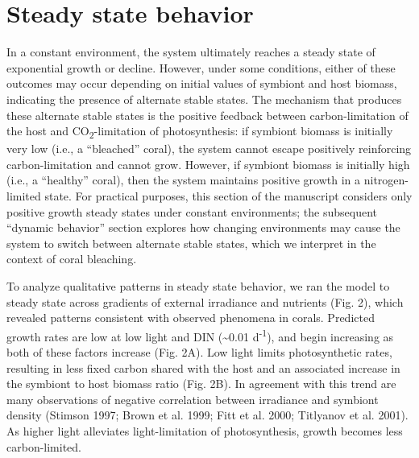 \documentclass[]{elsarticle} %
\begin{document}
\section{Steady state behavior}\label{steady-state-behavior}

In a constant environment, the system ultimately reaches a steady state
of exponential growth or decline. However, under some conditions, either
of these outcomes may occur depending on initial values of symbiont and
host biomass, indicating the presence of alternate stable states. The
mechanism that produces these alternate stable states is the positive
feedback between carbon-limitation of the host and
CO\textsubscript{2}-limitation of photosynthesis: if symbiont biomass is
initially very low (i.e., a ``bleached'' coral), the system cannot
escape positively reinforcing carbon-limitation and cannot grow.
However, if symbiont biomass is initially high (i.e., a ``healthy''
coral), then the system maintains positive growth in a nitrogen-limited
state. For practical purposes, this section of the manuscript considers
only positive growth steady states under constant environments; the
subsequent ``dynamic behavior'' section explores how changing
environments may cause the system to switch between alternate stable
states, which we interpret in the context of coral bleaching.

To analyze qualitative patterns in steady state behavior, we ran the
model to steady state across gradients of external irradiance and
nutrients (Fig. 2), which revealed patterns consistent with observed
phenomena in corals. Predicted growth rates are low at low light and DIN
(\textasciitilde{}0.01 d\textsuperscript{-1}), and begin increasing as
both of these factors increase (Fig. 2A). Low light limits
photosynthetic rates, resulting in less fixed carbon shared with the
host and an associated increase in the symbiont to host biomass ratio
(Fig. 2B). In agreement with this trend are many observations of
negative correlation between irradiance and symbiont density (Stimson
1997; Brown et al. 1999; Fitt et al. 2000; Titlyanov et al. 2001). As
higher light alleviates light-limitation of photosynthesis, growth
becomes less carbon-limited.
\end{document}
